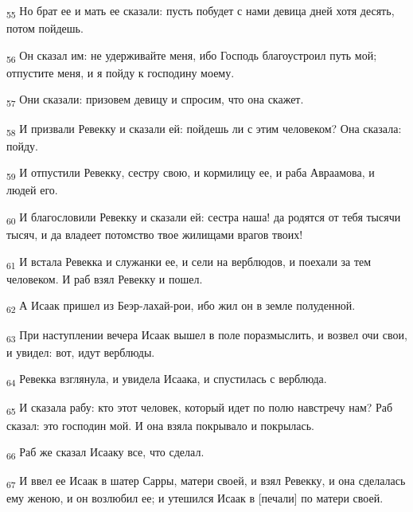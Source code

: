 \begin{tcolorbox}
\textsubscript{55} Но брат ее и мать ее сказали: пусть побудет с нами девица дней хотя десять, потом пойдешь.
\end{tcolorbox}
\begin{tcolorbox}
\textsubscript{56} Он сказал им: не удерживайте меня, ибо Господь благоустроил путь мой; отпустите меня, и я пойду к господину моему.
\end{tcolorbox}
\begin{tcolorbox}
\textsubscript{57} Они сказали: призовем девицу и спросим, что она скажет.
\end{tcolorbox}
\begin{tcolorbox}
\textsubscript{58} И призвали Ревекку и сказали ей: пойдешь ли с этим человеком? Она сказала: пойду.
\end{tcolorbox}
\begin{tcolorbox}
\textsubscript{59} И отпустили Ревекку, сестру свою, и кормилицу ее, и раба Авраамова, и людей его.
\end{tcolorbox}
\begin{tcolorbox}
\textsubscript{60} И благословили Ревекку и сказали ей: сестра наша! да родятся от тебя тысячи тысяч, и да владеет потомство твое жилищами врагов твоих!
\end{tcolorbox}
\begin{tcolorbox}
\textsubscript{61} И встала Ревекка и служанки ее, и сели на верблюдов, и поехали за тем человеком. И раб взял Ревекку и пошел.
\end{tcolorbox}
\begin{tcolorbox}
\textsubscript{62} А Исаак пришел из Беэр-лахай-рои, ибо жил он в земле полуденной.
\end{tcolorbox}
\begin{tcolorbox}
\textsubscript{63} При наступлении вечера Исаак вышел в поле поразмыслить, и возвел очи свои, и увидел: вот, идут верблюды.
\end{tcolorbox}
\begin{tcolorbox}
\textsubscript{64} Ревекка взглянула, и увидела Исаака, и спустилась с верблюда.
\end{tcolorbox}
\begin{tcolorbox}
\textsubscript{65} И сказала рабу: кто этот человек, который идет по полю навстречу нам? Раб сказал: это господин мой. И она взяла покрывало и покрылась.
\end{tcolorbox}
\begin{tcolorbox}
\textsubscript{66} Раб же сказал Исааку все, что сделал.
\end{tcolorbox}
\begin{tcolorbox}
\textsubscript{67} И ввел ее Исаак в шатер Сарры, матери своей, и взял Ревекку, и она сделалась ему женою, и он возлюбил ее; и утешился Исаак в [печали] по матери своей.
\end{tcolorbox}
